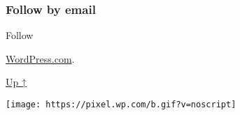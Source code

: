 \hypertarget{follow-by-email}{%
\subsubsection{Follow by email}\label{follow-by-email}}

Follow

\href{https://wordpress.com/?ref=footer_custom_com}{WordPress.com}.

\protect\hyperlink{}{Up ↑}

\texttt{[image: https://pixel.wp.com/b.gif?v=noscript]}
